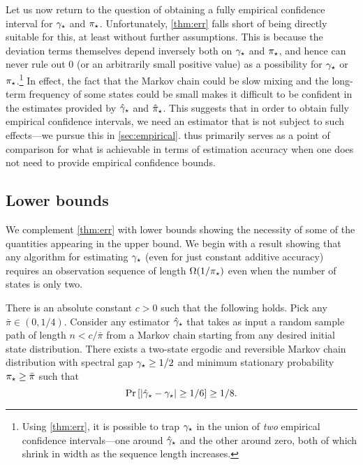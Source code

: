 Let us now return to the question of obtaining a fully empirical confidence 
interval for $\gamma_{\star}$ and $\pi_{\star}$.
Unfortunately, \cref{thm:err} falls short of being directly suitable for this,
at least without further assumptions.
This is because the deviation terms themselves depend inversely both
on $\gamma_{\star}$ and $\pi_{\star}$, and hence can never rule out $0$ (or an
arbitrarily small positive value) as a possibility for $\gamma_{\star}$ or
$\pi_{\star}$.\footnote{%
  Using \cref{thm:err}, it is possible to trap $\gamma_{\star}$ in the
  union of \emph{two} empirical confidence intervals---one around
  $\hat\gamma_{\star}$ and the other around zero, both of which shrink in width
  as the sequence length increases.%
}
In effect, the fact that the Markov chain could be slow mixing and the
long-term frequency of some states could be small makes it difficult
to be confident in the estimates provided by $\hat\gamma_{\star}$ and
$\hat\pi_{\star}$.
This suggests that in order to obtain fully empirical confidence
intervals, we need an estimator that is not subject to such
effects---we pursue this in \cref{sec:empirical}.
 thus primarily serves as a point of comparison
for what is achievable in terms of estimation accuracy when one does
not need to provide empirical confidence bounds.

\subsection{Lower bounds}

We complement \cref{thm:err} with lower bounds showing the
necessity of some of the quantities appearing in the upper bound.
We begin with a result showing that any algorithm for estimating
$\gamma_{\star}$ (even for just constant additive accuracy) requires an
observation sequence of length $\Omega(1/\pi_{\star})$
even when the number of states is only two.

\begin{theorem}
  \label{thm:lb-pimin}
  There is an absolute constant $c>0$ such that the following holds.
  Pick any $\bar\pi \in (0,1/4)$.
  Consider any estimator $\hat\gamma_{\star}$ that takes as input a random sample
  path of length $n < c/\bar\pi$ from a Markov chain starting from any
  desired initial state distribution.
  There exists a two-state ergodic and reversible Markov chain
  distribution with spectral gap $\gamma_{\star} \geq 1/2$ and minimum
  stationary probability $\pi_{\star} \geq \bar\pi$ such that
  \[
    \Pr\left[ |\hat\gamma_{\star} - \gamma_{\star}| \geq 1/6 \right] \geq 1/8 .
  \]
\end{theorem}

